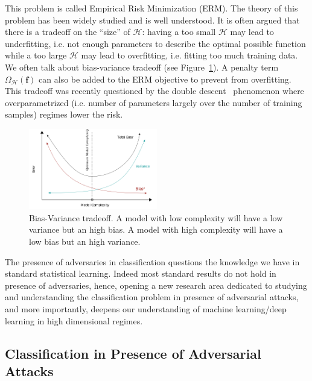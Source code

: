 This problem is called Empirical Risk Minimization (ERM). The theory of this problem has been widely studied and is well understood. It is often argued that there is a tradeoff on the ``size'' of $\mathcal{H}$: having a too small $\mathcal{H}$ may lead to underfitting, i.e. not enough parameters to describe the optimal possible function while a too large $\mathcal{H}$ may lead to overfitting, i.e. fitting too much training data. We often talk about bias-variance tradeoff (see Figure~\ref{fig:tradeoff_bias_accuracy}). A penalty term $\Omega_{\mathcal{H}}(\mathbf{f})$ can also be added to the ERM objective to prevent from overfitting. This tradeoff was recently questioned by the double descent~\citep{belkin2019reconciling} phenomenon where overparametrized (i.e. number of parameters largely over the number of training samples) regimes lower the risk.
\begin{figure}
    \centering
    \includegraphics[width=0.5\textwidth]{Images/tradeoff_bias_variance.png}
    \caption{Bias-Variance tradeoff. A model with low complexity will have a low variance but an high bias. A model with high complexity will have a low bias but an high variance.}
    \label{fig:tradeoff_bias_accuracy}
\end{figure}
\begin{tcolorbox}[colback=grund,colframe=rahmen]
The presence of adversaries in classification questions the knowledge we have in standard statistical learning. Indeed most standard results do not hold in presence of adversaries, hence, opening a new research area dedicated to studying and understanding the classification problem in presence of adversarial attacks, and more importantly, deepens our understanding of  machine learning/deep learning in high dimensional regimes.
\end{tcolorbox}


\subsection{Classification in Presence of Adversarial Attacks}

